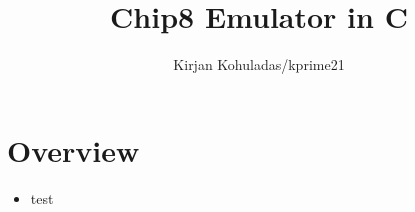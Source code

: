 \documentclass{article}
\title{\vspace{-7em} Chip8 Emulator in C}
\author{Kirjan Kohuladas/kprime21}
\date{}
\begin{document}
\maketitle

\section*{Overview}
\begin{itemize}
	\item test
\end{itemize}
\end{document}
